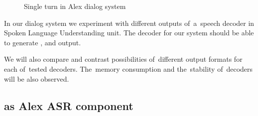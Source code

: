 \begin{figure}
    \begin{center}
    
    \caption{Single turn in Alex dialog system}
    \label{fig:dialog_system} 
    \end{center}
\end{figure}

In our dialog system we experiment with different outputs of~a~speech decoder in Spoken Language Understanding unit. 
The decoder for our system should be able to generate ,  and  output.




% 
% 

We will also compare and contrast possibilities of~different output formats for each of~tested decoders. The~memory consumption and the~stability of~decoders will be also observed. 


\subsection{ as Alex ASR component}
\label{sub:asr_component}







